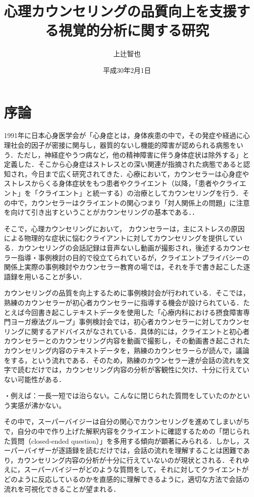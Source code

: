 \documentclass[shuuron]{kuee}
\title{心理カウンセリングの品質向上を支援する視覚的分析に関する研究}
\author{上辻智也}
\date{平成30年2月1日}
\begin{document}
\maketitle
\tableofcontents


\chapter{序論}



1991年に日本心身医学会が「心身症とは，身体疾患の中で，その発症や経過に心理社会的因子が密接に関与し，器質的ないし機能的障害が認められる病態をいう．ただし，神経症やうつ病など，他の精神障害に伴う身体症状は除外する」と定義した\cite{shinshinigaku}．そこから心身症はストレスとの深い関連が指摘された病態であると認知され，今日まで広く研究されてきた．心療において，カウンセラーは心身症やストレスからくる身体症状をもつ患者やクライエント（以降，「患者やクライエント」を「クライエント」と統一する）の治療としてカウンセリングを行う．その中で，カウンセラーはクライエントの関心つまり「対人関係上の問題」に注意を向けて引き出すということがカウンセリングの基本である\cite{zokad}．．

  そこで，心理カウンセリングにおいて， カウンセラーは，主にストレスの原因による物理的な症状に悩むクライアントに対してカウンセリングを提供している．カウンセリングの会話記録は音声ないし動画が撮影され，後述するカウンセラー指導・事例検討の目的で役立てられているが，クライエントプライバシーの関係上実際の事例検討やカウンセラー教育の場では，それを手で書き起こした逐語録を用いることが多い．






カウンセリングの品質を向上するために事例検討会が行われている．そこでは，熟練のカウンセラーが初心者カウンセラーに指導する機会が設けられている．たとえば今回書き起こしテキストデータを使用した「心療内科における摂食障害専門ヨーガ療法グループ」事例検討会では，初心者カウンセラーに対してカウンセリングに関するアドバイスがなされている．具体的には，クライエントと初心者カウンセラーとのカウンセリング内容を動画で撮影し，その動画書き起こされたカウンセリング内容のテキストデータを，熟練のカウンセラーらが読んで，議論をする，という流れである．そのため，熟練のカウンセラー達が会話の流れを文字で読むだけでは，カウンセリング内容の分析が客観性に欠け、十分に行えていない可能性がある．

・例えば：一長一短では治らない。こんなに閉じられた質問をしていたのかという実感が沸かない。

その中で，スーパーバイジーは自分の関心でカウンセリングを進めてしまいがちで，自分の中で作り上げた解釈内容をクライエントに確認するための「閉じられた質問（closed-ended question）」を多用する傾向が顕著にみられる．しかし，スーパーバイザーが逐語録を読むだけでは，会話の流れを理解することは困難であり，カウンセリング内容の分析が十分に行えていないのが現状とされる．それゆえに，スーパーバイジーがどのような質問をして，それに対してクライエントがどのように反応しているのかを直感的に理解できるように，適切な方法で会話の流れを可視化できることが望まれる．
\end{document}
